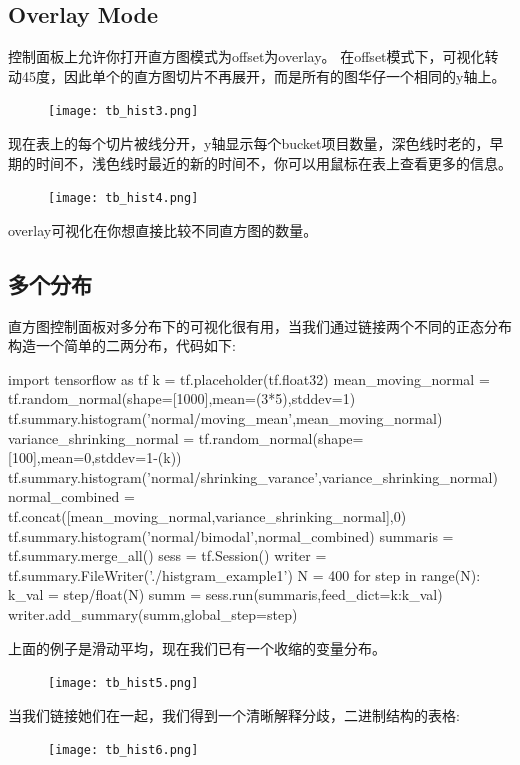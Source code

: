 \subsection{Overlay Mode}
控制面板上允许你打开直方图模式为offset为overlay。
在offset模式下，可视化转动45度，因此单个的直方图切片不再展开，而是所有的图华仔一个相同的y轴上。
\begin{center}
\begin{figure}[H]
\texttt{[image: tb\_hist3.png]}
\end{figure}
\end{center}
现在表上的每个切片被线分开，y轴显示每个bucket项目数量，深色线时老的，早期的时间不，浅色线时最近的新的时间不，你可以用鼠标在表上查看更多的信息。
\begin{center}
\begin{figure}[H]
\texttt{[image: tb\_hist4.png]}
\end{figure}
\end{center}

overlay可视化在你想直接比较不同直方图的数量。
\subsection{多个分布}
直方图控制面板对多分布下的可视化很有用，当我们通过链接两个不同的正态分布构造一个简单的二两分布，代码如下:
\begin{python}
import tensorflow as tf
k = tf.placeholder(tf.float32)
mean_moving_normal = tf.random_normal(shape=[1000],mean=(3*5),stddev=1)
tf.summary.histogram('normal/moving_mean',mean_moving_normal)
variance_shrinking_normal = tf.random_normal(shape=[100],mean=0,stddev=1-(k))
tf.summary.histogram('normal/shrinking_varance',variance_shrinking_normal)
normal_combined = tf.concat([mean_moving_normal,variance_shrinking_normal],0)
tf.summary.histogram('normal/bimodal',normal_combined)
summaris = tf.summary.merge_all()
sess = tf.Session()
writer = tf.summary.FileWriter('./histgram_example1')
N = 400
for step in range(N):
    k_val = step/float(N)
    summ = sess.run(summaris,feed_dict={k:k_val})
    writer.add_summary(summ,global_step=step)
\end{python}
上面的例子是滑动平均，现在我们已有一个收缩的变量分布。
\begin{center}
\begin{figure}[H]
\texttt{[image: tb\_hist5.png]}
\end{figure}
\end{center}
当我们链接她们在一起，我们得到一个清晰解释分歧，二进制结构的表格:
\begin{center}
\begin{figure}[H]
\texttt{[image: tb\_hist6.png]}
\end{figure}
\end{center}
